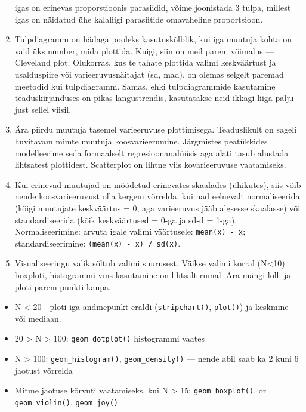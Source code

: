 \documentclass[]{book}
\begin{document}
\begin{enumerate}
  igas on erinevas proporstioonis parasiidid, võime joonistada 3 tulpa,
  millest igas on näidatud ühe kalaliigi parasiitide omavaheline
  proportsioon.
\item
  Tulpdiagramm on hädaga pooleks kasutuskõlblik, kui iga muutuja kohta
  on vaid üks number, mida plottida. Kuigi, siin on meil parem võimalus
  --- Cleveland plot. Olukorras, kus te tahate plottida valimi
  keskväärtust ja usalduspiire või varieeruvusnäitajat (sd, mad), on
  olemas selgelt paremad meetodid kui tulpdiagramm. Samas, ehki
  tulpdiagrammide kasutamine teaduskirjanduses on pikas langustrendis,
  kasutatakse neid ikkagi liiga palju just sellel viisil.
\item
  Ära piirdu muutuja tasemel varieeruvuse plottimisega. Teaduslikult on
  sageli huvitavam mimte muutuja koosvarieerumine. Järgmistes
  peatükkides modelleerime seda formaalselt regresioonanalüüsis aga
  alati tasub alustada lihtsatest plottidest. Scatterplot on lihtne viis
  kovarieeruvuse vaatamiseks.
\item
  Kui erinevad muutujad on mõõdetud erinevates skaalades (ühikutes),
  siis võib nende koosvarieeruvust olla kergem võrrelda, kui nad
  eelnevalt normaliseerida (kõigi muutujate keskväärtus = 0, aga
  varieeruvus jääb algsesse skaalasse) või standardiseerida (kõik
  keskväärtused = 0-ga ja sd-d = 1-ga). Normaliseerimine: arvuta igale
  valimi väärtusele: \texttt{mean(x)\ -\ x}; standardiseerimine:
  \texttt{(mean(x)\ -\ x)\ /\ sd(x)}.
\item
  Visualiseeringu valik sõltub valimi suurusest. Väikse valimi korral
  (N\textless{}10) boxploti, histogrammi vms kasutamine on lihtsalt
  rumal. Ära mängi lolli ja ploti parem punkti kaupa.
\end{enumerate}

\begin{itemize}
\item
  N \textless{} 20 - ploti iga andmepunkt eraldi (\texttt{stripchart()},
  \texttt{plot()}) ja keskmine või mediaan.
\item
  20 \textgreater{} N \textgreater{} 100: \texttt{geom\_dotplot()}
  histogrammi vaates
\item
  N \textgreater{} 100: \texttt{geom\_histogram()},
  \texttt{geom\_density()} --- nende abil saab ka 2 kuni 6 jaotust
  võrrelda
\item
  Mitme jaotuse kõrvuti vaatamiseks, kui N \textgreater{} 15:
  \texttt{geom\_boxplot()}, or \texttt{geom\_violin()},
  \texttt{geom\_joy()}
\end{itemize}
\end{document}
